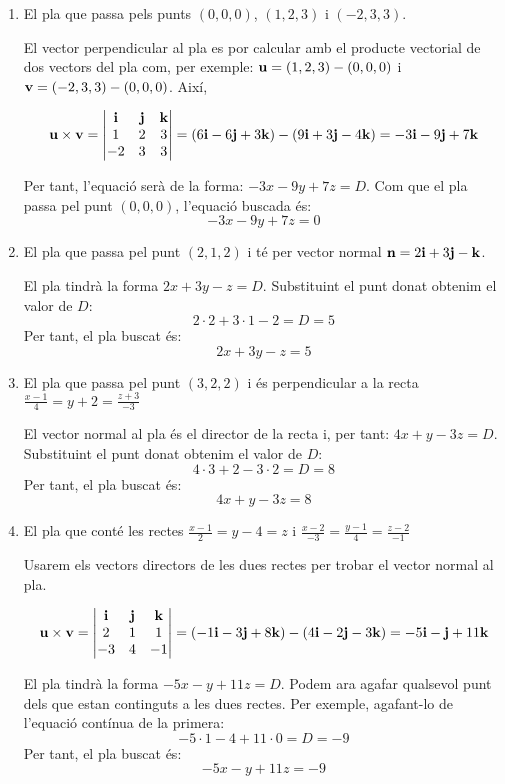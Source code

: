 \begin{enumerate}
  \item El pla que passa pels punts $(0,0,0)$, $(1,2,3)$ i $(-2,3,3)$.

El vector perpendicular al pla es por calcular amb el producte vectorial de dos vectors del pla com, per exemple: $\textbf{u}=(1,2,3)-(0,0,0)$ i $\textbf{v}=(-2,3,3)-(0,0,0)$. Així,

\[
\textbf{u} \times \textbf{v}=
\begin{vmatrix}
\textbf{i} & \textbf{j} & \textbf{k} \\
1 & 2 & 3\\
-2 & 3 & 3
\end{vmatrix}=
(6\textbf{i}-6\textbf{j}+3\textbf{k})-(9\textbf{i}+3\textbf{j}-4\textbf{k})=-3\textbf{i}-9\textbf{j}+7\textbf{k}
\]

Per tant, l'equació serà de la forma: $-3x-9y+7z=D$. Com que el pla passa pel punt $(0,0,0)$, l'equació buscada és:
\[
-3x-9y+7z=0
\]

  \item El pla que passa pel punt $(2,1,2)$ i té per vector normal $\textbf{n}=2\textbf{i}+3\textbf{j}-\textbf{k}$.

El pla tindrà la forma $2x+3y-z=D$. Substituint el punt donat obtenim el valor de $D$:
\[
2\cdot2+3\cdot1-2=D=5
\]
Per tant, el pla buscat és:
\[
2x+3y-z=5
\]

  \item El pla que passa pel punt $(3,2,2)$ i és perpendicular a la recta $\frac{x-1}{4}=y+2=\frac{z+3}{-3}$

El vector normal al pla és el director de la recta i, per tant: $4x+y-3z=D$. Substituint el punt donat obtenim el valor de $D$:
\[
4\cdot3+2-3\cdot2=D=8
\]
Per tant, el pla buscat és:
\[
4x+y-3z=8
\]

  \item El pla que conté les rectes $\frac{x-1}{2}=y-4=z$ i $\frac{x-2}{-3}=\frac{y-1}{4}=\frac{z-2}{-1}$

Usarem els  vectors directors de les dues rectes per trobar el vector normal al pla.

\[
\textbf{u} \times \textbf{v}=
\begin{vmatrix}
\textbf{i} & \textbf{j} & \textbf{k} \\
2 & 1 & 1\\
-3 & 4 & -1
\end{vmatrix}=
(-1\textbf{i}-3\textbf{j}+8\textbf{k})-(4\textbf{i}-2\textbf{j}-3\textbf{k})=-5\textbf{i}-\textbf{j}+11\textbf{k}
\]

El pla tindrà la forma $-5x-y+11z=D$. Podem ara agafar qualsevol punt dels que estan continguts a les dues rectes. Per exemple, agafant-lo de l'equació contínua de la primera:
\[
-5\cdot1-4+11\cdot0=D=-9
\]
Per tant, el pla buscat és:
\[
-5x-y+11z=-9
\]




\end{enumerate}
